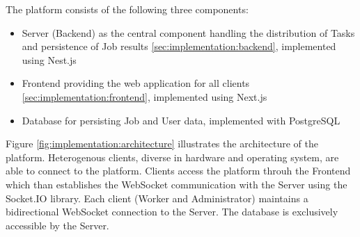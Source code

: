 The platform consists of the following three components:
\begin{itemize}
    \item Server (Backend) as the central component handling the distribution of Tasks and persistence of Job results \ref{sec:implementation:backend}, implemented using Nest.js \cite{methodology:nestjs}
    \item Frontend providing the web application for all clients \ref{sec:implementation:frontend}, implemented using Next.js \cite{methodology:nextjs}
    \item Database for persisting Job and User data, implemented with PostgreSQL \cite{methodology:db}
\end{itemize}
Figure \ref{fig:implementation:architecture} illustrates the architecture of the platform. Heterogenous clients, diverse in hardware and operating system, are able to connect to the platform. Clients access the platform throuh the Frontend which than establishes the WebSocket communication with the Server using the Socket.IO \cite{methodology:websockets2} library. Each client (Worker and Administrator) maintains a bidirectional WebSocket connection to the Server. The database is exclusively accessible by the Server.

